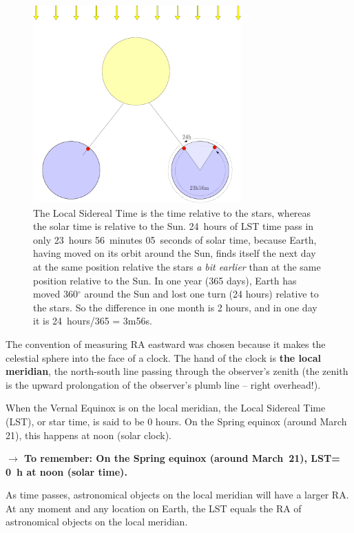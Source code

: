 \begin{figure}[ht]
\begin{center}
 \includegraphics[width=8cm]{../figures/lst.pdf}
\end{center}
\caption{The Local Sidereal Time is the time relative to the stars, whereas the 
solar time is relative to the Sun. 24~hours of LST time pass in only 
23~hours 56~minutes 05~seconds of solar time, because Earth, having 
moved on its orbit around the Sun, finds itself the next day at the same position 
relative the stars {\em a bit earlier} than at the same position relative
to the Sun. 
In one year (365 days), Earth has moved 360$^\circ$ around the Sun and lost one 
turn (24 hours) relative to the stars. So the difference in one month is 2 hours, and in one day it is 24~hours/365 = 
3m56s.
}
\label{figlst}
\end{figure}

The convention of measuring RA eastward was chosen
because it makes the celestial sphere into the face of a clock. 
The hand of the clock is {\bf the local meridian}, 
the north-south line passing through the observer's zenith 
(the zenith is the upward prolongation of the observer's plumb line --
right overhead!). 

When the Vernal Equinox is on the local meridian, the Local Sidereal
Time (LST), or star time, is said to be 0 hours. 
On the Spring equinox (around March 21), this happens at noon (solar clock). 

{\bf$\rightarrow$ To remember: On the Spring equinox (around March~21), LST= 0~h at noon (solar time).}

As time passes, 
astronomical objects on the local meridian will have a larger RA.
At any moment and any location on Earth, 
the LST equals the RA of astronomical objects on the
local meridian. 


